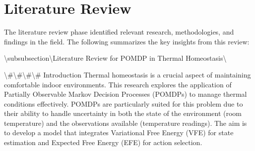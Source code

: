 \documentclass[11pt,a4paper]{article}
\begin{document}
\section{Literature Review}

The literature review phase identified relevant research, methodologies, and findings in the field. The following summarizes the key insights from this review:

\textbackslash{}subsubsection\textbackslash{}{Literature Review for POMDP in Thermal Homeostasis\textbackslash{}}

\textbackslash{}#\textbackslash{}#\textbackslash{}#\textbackslash{}# Introduction
Thermal homeostasis is a crucial aspect of maintaining comfortable indoor environments. This research explores the application of Partially Observable Markov Decision Processes (POMDPs) to manage thermal conditions effectively. POMDPs are particularly suited for this problem due to their ability to handle uncertainty in both the state of the environment (room temperature) and the observations available (temperature readings). The aim is to develop a model that integrates Variational Free Energy (VFE) for state estimation and Expected Free Energy (EFE) for action selection.
\end{document}
